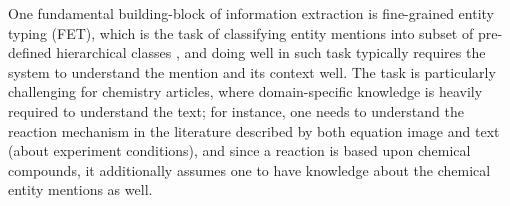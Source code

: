 One fundamental building-block of information extraction is fine-grained entity typing (FET), which is the task of classifying entity mentions into subset of pre-defined hierarchical classes  , and doing well in such task typically requires the system to understand the mention and its context well.
The task is particularly challenging for chemistry articles, where domain-specific knowledge is heavily required to understand the text; for instance, one needs to understand the reaction mechanism in the literature described by both equation image and text (about experiment conditions), and since a reaction is based upon chemical compounds, it additionally assumes one to have knowledge about the chemical entity mentions as well. 




